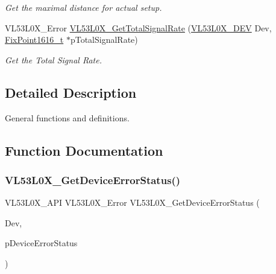\begin{DoxyCompactItemize}
\begin{DoxyCompactList}\small\item\em Get the maximal distance for actual setup. \end{DoxyCompactList}\item 
V\+L53\+L0\+X\+\_\+\+Error \hyperlink{group__VL53L0X__general__group_gaee98657af1e74394c5e3fc4d4b383dbf}{V\+L53\+L0\+X\+\_\+\+Get\+Total\+Signal\+Rate} (\hyperlink{group__VL53L0X__platform__group_ga2d6405308b1dd524b462f1b8fb97d167}{V\+L53\+L0\+X\+\_\+\+D\+EV} Dev, \hyperlink{vl53l0x__types_8h_afb910790161809fc76e1a274a6349384}{Fix\+Point1616\+\_\+t} $\ast$p\+Total\+Signal\+Rate)
\begin{DoxyCompactList}\small\item\em Get the Total Signal Rate. \end{DoxyCompactList}\end{DoxyCompactItemize}


\subsection{Detailed Description}
General functions and definitions. 



\subsection{Function Documentation}
\mbox{\label{group__VL53L0X__general__group_gad8bd4b6c24974fd55102615aed0efa14}} 
\subsubsection{\texorpdfstring{V\+L53\+L0\+X\+\_\+\+Get\+Device\+Error\+Status()}{VL53L0X\_GetDeviceErrorStatus()}}
{\footnotesize\ttfamily V\+L53\+L0\+X\+\_\+\+A\+PI V\+L53\+L0\+X\+\_\+\+Error V\+L53\+L0\+X\+\_\+\+Get\+Device\+Error\+Status (\begin{DoxyParamCaption}\item[{\hyperlink{group__VL53L0X__platform__group_ga2d6405308b1dd524b462f1b8fb97d167}{V\+L53\+L0\+X\+\_\+\+D\+EV}}]{Dev,  }\item[{V\+L53\+L0\+X\+\_\+\+Device\+Error $\ast$}]{p\+Device\+Error\+Status }\end{DoxyParamCaption})}




